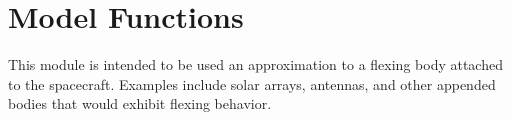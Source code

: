 \section{Model Functions}

This module is intended to be used an approximation to a flexing body attached to the spacecraft. Examples include solar arrays, antennas, and other appended bodies that would exhibit flexing behavior. 